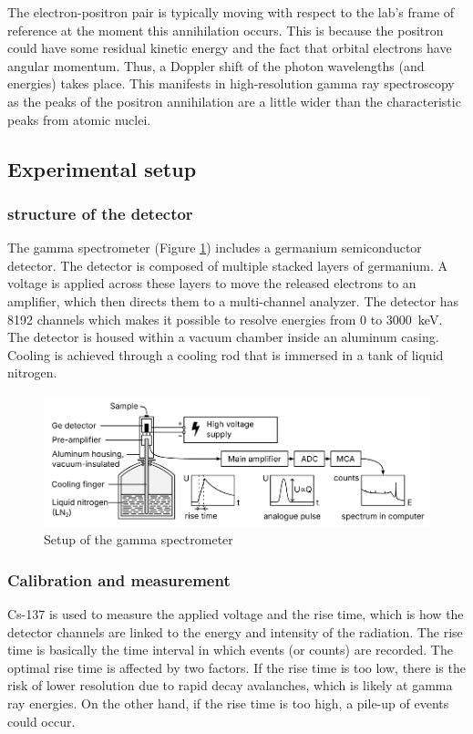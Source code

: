 \documentclass{article}
\begin{document}
The electron-positron pair is typically moving with respect to the lab's frame of reference at the moment this annihilation occurs. This is because the positron could have some residual kinetic energy and the fact that orbital electrons have angular momentum. Thus, a Doppler shift of the photon wavelengths (and energies) takes place. This manifests in high-resolution gamma ray spectroscopy as the peaks of the positron annihilation are a little wider than the characteristic peaks from atomic nuclei.

\pagebreak{}

\subsection{Experimental setup}
\subsubsection{structure of the detector}
The gamma spectrometer (Figure \ref{fig:spec}) includes a germanium semiconductor detector. The detector is composed of multiple stacked layers of germanium. A voltage is applied across these layers to move the released electrons to an amplifier, which then directs them to a multi-channel analyzer. The detector has 8192 channels which makes it possible to resolve energies from 0 to \SI{3000}{keV}. The detector is housed within a vacuum chamber inside an aluminum casing. Cooling is achieved through a cooling rod that is immersed in a tank of liquid nitrogen.

\begin{figure}[h]
    \centering
    \includegraphics[width=0.5\linewidth]{Figures/Intro/5.png}
    \caption{Setup of the gamma spectrometer \cite{plotzki_2024_highresolution}}
    \label{fig:spec}
\end{figure}


\subsubsection{Calibration and measurement}
Cs-137 is used to measure the applied voltage and the rise time, which is how the detector channels are linked to the energy and intensity of the radiation. The rise time is basically the time interval in which events (or counts) are recorded. The optimal rise time is affected by two factors. If the rise time is too low, there is the risk of lower resolution due to rapid decay avalanches, which is likely at gamma ray energies. On the other hand, if the rise time is too high, a pile-up of events could occur.
\end{document}
